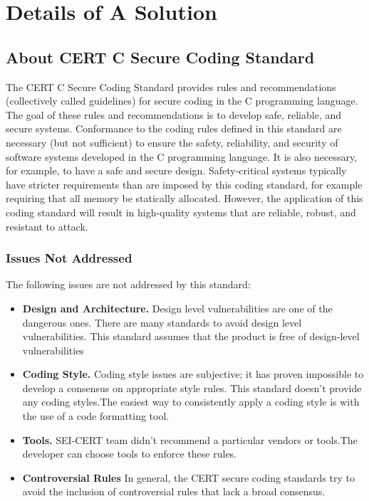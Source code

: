 \chapter{Details of A Solution}
\section{About CERT C Secure Coding Standard }
The CERT C Secure Coding Standard provides rules and recommendations (collectively called guidelines) for secure coding in the C programming language. The goal of these rules and recommendations is to develop safe, reliable, and secure systems. Conformance to the coding rules defined in this standard are necessary (but not sufficient) to ensure the safety, reliability, and security of software systems developed in the C programming language. It is also necessary, for example, to have a safe and secure design. Safety-critical systems typically have stricter requirements than are imposed by this coding standard, for example requiring that all memory be statically allocated. However, the application of this coding standard will result in high-quality systems that are reliable, robust, and resistant to attack.

\subsection{Issues Not Addressed}
The following issues are not addressed by this standard:
\begin{itemize}
	\item \textbf{Design and Architecture.} Design level vulnerabilities are one of the dangerous ones. There are many standards to avoid design level vulnerabilities. This standard assumes that the product is free of design-level vulnerabilities
	
	\item \textbf{Coding Style.} Coding style issues are subjective; it has proven impossible to develop a
	consensus on appropriate style rules. This standard doesn't provide any coding styles.The easiest way to consistently apply a coding style is with the
	use of a code formatting tool. 
	
	\item \textbf{Tools.} SEI-CERT team didn't recommend  a particular vendors or
	tools.The developer can choose tools to enforce these rules.
	\item \textbf{ Controversial Rules} In general, the CERT secure coding standards try to avoid the
	inclusion of controversial rules that lack a broad consensus.
\end{itemize}
